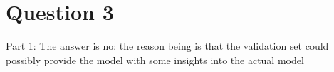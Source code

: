 \documentclass{article}
\begin{document}
\pagebreak

\section{Question 3}\label{sec:questionthree}

\item Part\hspace{0.5cm} 1: \hspace{0.5cm}The\hspace{0.5cm} answer \hspace{0.5cm}is \hspace{0.5cm}no\hspace{0.5cm}:\hspace{0.5cm} the \hspace{0.5cm}reason \hspace{0.5cm}being \hspace{0.5cm}is \hspace{0.5cm}that\hspace{0.5cm} the \hspace{0.5cm}validation\hspace{0.5cm} set\hspace{0.5cm} could\hspace{0.5cm} possibly\hspace{0.5cm} 
provide \hspace{0.5cm}the\hspace{0.5cm} model\hspace{0.5cm} with\hspace{0.5cm} some\hspace{0.5cm} insights\hspace{0.5cm} into\hspace{0.5cm} the\hspace{0.5cm} actual\hspace{0.5cm} model\hspace{0.5cm}

\\
\end{document}
